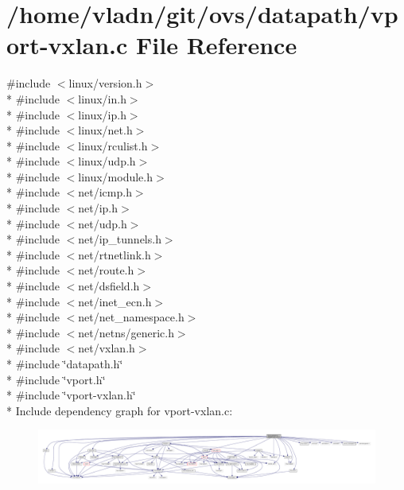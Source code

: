 \hypertarget{vport-vxlan_8c}{}\section{/home/vladn/git/ovs/datapath/vport-\/vxlan.c File Reference}
\label{vport-vxlan_8c}
{\ttfamily \#include $<$linux/version.\+h$>$}\\*
{\ttfamily \#include $<$linux/in.\+h$>$}\\*
{\ttfamily \#include $<$linux/ip.\+h$>$}\\*
{\ttfamily \#include $<$linux/net.\+h$>$}\\*
{\ttfamily \#include $<$linux/rculist.\+h$>$}\\*
{\ttfamily \#include $<$linux/udp.\+h$>$}\\*
{\ttfamily \#include $<$linux/module.\+h$>$}\\*
{\ttfamily \#include $<$net/icmp.\+h$>$}\\*
{\ttfamily \#include $<$net/ip.\+h$>$}\\*
{\ttfamily \#include $<$net/udp.\+h$>$}\\*
{\ttfamily \#include $<$net/ip\+\_\+tunnels.\+h$>$}\\*
{\ttfamily \#include $<$net/rtnetlink.\+h$>$}\\*
{\ttfamily \#include $<$net/route.\+h$>$}\\*
{\ttfamily \#include $<$net/dsfield.\+h$>$}\\*
{\ttfamily \#include $<$net/inet\+\_\+ecn.\+h$>$}\\*
{\ttfamily \#include $<$net/net\+\_\+namespace.\+h$>$}\\*
{\ttfamily \#include $<$net/netns/generic.\+h$>$}\\*
{\ttfamily \#include $<$net/vxlan.\+h$>$}\\*
{\ttfamily \#include \char`\"{}datapath.\+h\char`\"{}}\\*
{\ttfamily \#include \char`\"{}vport.\+h\char`\"{}}\\*
{\ttfamily \#include \char`\"{}vport-\/vxlan.\+h\char`\"{}}\\*
Include dependency graph for vport-\/vxlan.c\+:
\nopagebreak
\begin{figure}[H]
\begin{center}
\leavevmode
\includegraphics[width=350pt]{vport-vxlan_8c__incl}
\end{center}
\end{figure}
